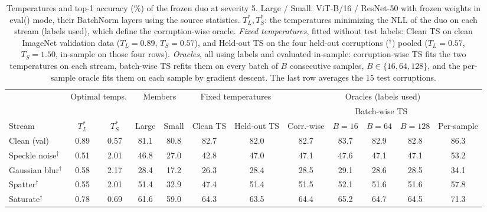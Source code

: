 \begin{table}[t]
    \centering
    \small
    \setlength{\tabcolsep}{4.5pt}
    \caption{Temperatures and top-1 accuracy (\%) of the frozen duo at severity 5. Large / Small: ViT-B/16 / ResNet-50 with frozen weights in eval() mode, their BatchNorm layers using the source statistics. $T_L^*, T_S^*$: the temperatures minimizing the NLL of the duo on each stream (labels used), which define the corruption-wise oracle. \emph{Fixed temperatures}, fitted without test labels: Clean TS on clean ImageNet validation data ($T_L = 0.89$, $T_S = 0.57$), and Held-out TS on the four held-out corruptions ($^\dagger$) pooled ($T_L = 0.57$, $T_S = 1.50$, in-sample on those four rows). \emph{Oracles}, all using labels and evaluated in-sample: corruption-wise TS fits the two temperatures on each stream, batch-wise TS refits them on every batch of $B$ consecutive samples, $B \in \{16, 64, 128\}$, and the per-sample oracle fits them on each sample by gradient descent. The last row averages the 15 test corruptions.}
    \label{tab:temperatures:frozen}
    \label{tab:oracles:frozen}
    \begin{tabular}{l|cc|cc|cc|ccccc}
        \toprule
        & \multicolumn{2}{c|}{Optimal temps.} & \multicolumn{2}{c|}{Members} & \multicolumn{2}{c|}{Fixed temperatures} & \multicolumn{5}{c}{Oracles (labels used)} \\
         &  &  &  &  &  &  &  & \multicolumn{3}{c}{Batch-wise TS} &  \\
        \cmidrule(lr){9-11}
        Stream & $T_L^*$ & $T_S^*$ & Large & Small & Clean TS & Held-out TS & Corr.-wise & $B{=}16$ & $B{=}64$ & $B{=}128$ & Per-sample \\
        \midrule
        Clean (val) & 0.89 & 0.57 & 81.1 & 80.8 & 82.7 & 82.0 & 82.7 & 83.7 & 82.9 & 82.8 & 86.3 \\
        \midrule
        Speckle noise$^\dagger$ & 0.51 & 2.01 & 46.8 & 27.0 & 42.8 & 47.0 & 47.1 & 47.6 & 47.1 & 47.1 & 53.2 \\
        Gaussian blur$^\dagger$ & 0.58 & 2.17 & 28.4 & 17.2 & 26.3 & 28.4 & 28.5 & 29.1 & 28.6 & 28.5 & 34.1 \\
        Spatter$^\dagger$ & 0.55 & 2.01 & 51.4 & 32.9 & 47.4 & 51.4 & 51.5 & 52.1 & 51.6 & 51.6 & 57.8 \\
        Saturate$^\dagger$ & 0.78 & 0.69 & 61.6 & 59.0 & 64.3 & 63.5 & 64.4 & 65.2 & 64.7 & 64.5 & 71.3 \\
        \midrule

\end{tabular}
\end{table}
